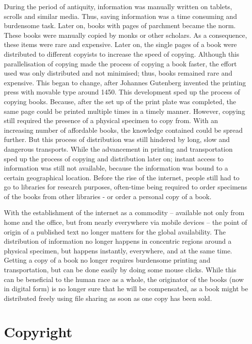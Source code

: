 \documentclass[a4paper]{report}
\begin{document}
During the period of antiquity, information was manually written on tablets, scrolls and similar media. Thus, saving information was a time consuming and burdensome task.  Later on, books with pages of parchment became the norm. These books were manually copied by monks or other scholars. As a consequence, these items were rare and expensive. Later on, the single pages of a book were distributed to different copyists to increase the speed of copying. Although this parallelisation of copying made the process of copying a book faster, the effort used was only distributed and not minimised; thus, books remained rare and expensive. This began to change, after Johannes Gutenberg invented the printing press with movable type around 1450. This development sped up the process of copying books. Because, after the set up of the print plate was completed, the same page could be printed multiple times in a timely manner. However, copying still required the presence of a physical specimen to copy from. With an increasing number of affordable books, the knowledge contained could be spread further. But this process of distribution was still hindered by long, slow and dangerous transports. While the advancement in printing and transportation sped up the process of copying and distribution later on; instant access to information was still not available, because the information was bound to a certain geographical location. Before the rise of the internet, people still had to go to libraries for research purposes, often-time being required to order specimens of the books from other libraries - or order a personal copy of a book.

With the establishment of the internet as a commodity -- available not only from home and the office, but from nearly everywhere via mobile devices -- the point of origin of a published text no longer matters for the global availability. The distribution of information no longer happens in concentric regions around a physical specimen, but happens instantly, everywhere, and at the same time. Getting a copy of a book no longer requires burdensome printing and transportation, but can be done easily by doing some mouse clicks. While this can be beneficial to the human race as a whole, the originator of the books (now in digital form) is no longer sure that he will be compensated, as a book might be distributed freely using file sharing as soon as one copy has been sold.

\section{Copyright}
\label{sec:Copyright}
\end{document}
